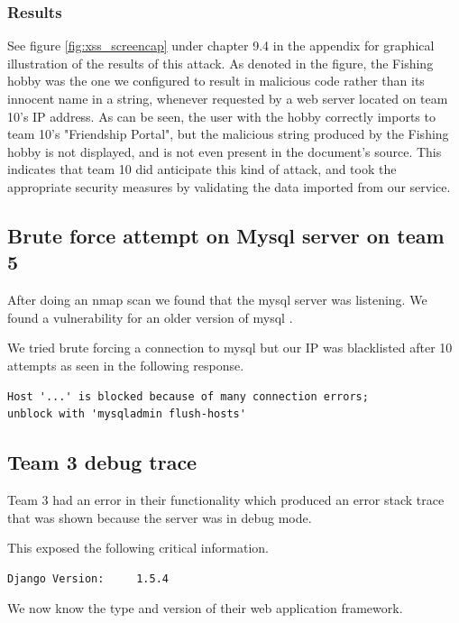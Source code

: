 \documentclass[a4paper]{article}
\begin{document}
\subsubsection{Results}
See figure \ref{fig:xss_screencap} under chapter 9.4 in the appendix for graphical illustration of the results of this attack. As denoted in the figure, the Fishing hobby was the one we configured to result in malicious code rather than its innocent name in a string, whenever requested by a web server located on team 10's IP address. As can be seen, the user with the hobby correctly imports to team 10's "Friendship Portal", but the malicious string produced by the Fishing hobby is not displayed, and is not even present in the document's source. This indicates that team 10 did anticipate this kind of attack, and took the appropriate security measures by validating the data imported from our service.


\subsection{Brute force attempt on Mysql server on team 5}
After doing an nmap scan we found that the mysql server was listening.
We found a vulnerability for an older version of mysql \cite{Mysql2012}. 

We tried brute forcing a connection to mysql but our IP was blacklisted after 10 attempts as seen in the following response.
\begin{verbatim}
Host '...' is blocked because of many connection errors; 
unblock with 'mysqladmin flush-hosts'
\end{verbatim}

\subsection{Team 3 debug trace}
Team 3 had an error in their functionality which produced an error stack trace that was shown because the server was in debug mode.

This exposed the following critical information.
\begin{verbatim}
Django Version: 	1.5.4
\end{verbatim}
We now know the type and version of their web application framework.
\end{document}
